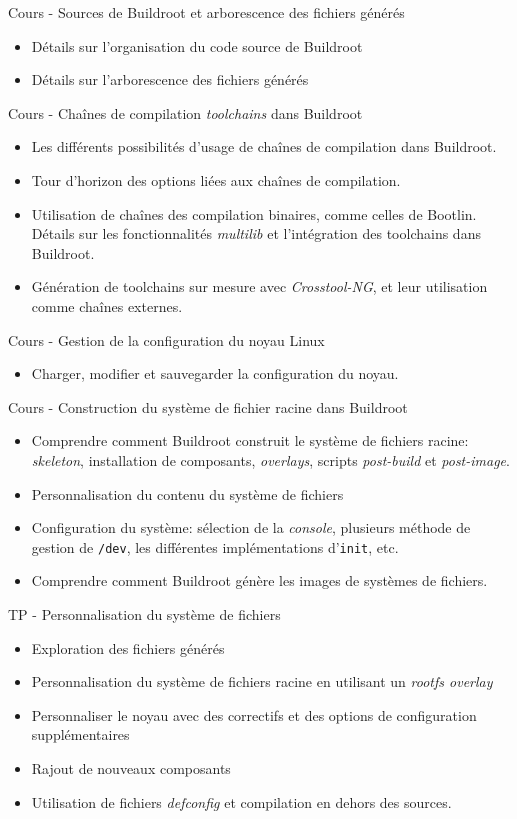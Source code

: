 \documentclass[a4paper,12pt,obeyspaces,spaces,hyphens]{article}
\begin{document}
\feagendatwocolumn
{Cours - Sources de Buildroot et arborescence des fichiers générés}
{
  \begin{itemize}
  \item Détails sur l'organisation du code source de Buildroot
  \item Détails sur l'arborescence des fichiers générés
  \end{itemize}
}
{Cours - Chaînes de compilation {\em toolchains} dans Buildroot}
{
  \begin{itemize}
  \item Les différents possibilités d'usage de chaînes de compilation
	dans Buildroot.
  \item Tour d'horizon des options liées aux chaînes de compilation.
  \item Utilisation de chaînes des compilation binaires, comme
	celles de Bootlin. Détails sur les fonctionnalités
        {\em multilib} et l'intégration des toolchains dans Buildroot.
  \item Génération de toolchains sur mesure avec {\em Crosstool-NG},
	et leur utilisation comme chaînes externes.
  \end{itemize}
}

\feagendatwocolumn
{Cours - Gestion de la configuration du noyau Linux}
{
  \begin{itemize}
  \item Charger, modifier et sauvegarder la configuration du noyau.
  \end{itemize}
}
{Cours - Construction du système de fichier racine dans Buildroot}
{
  \begin{itemize}
  \item Comprendre comment Buildroot construit le système de fichiers
	racine: {\em skeleton}, installation de composants, {\em
        overlays}, scripts {\em post-build} et {\em post-image}.
  \item Personnalisation du contenu du système de fichiers
  \item Configuration du système: sélection de la {\em console},
	plusieurs méthode de gestion de {\tt /dev}, les différentes
	implémentations d'{\tt init}, etc.
  \item Comprendre comment Buildroot génère les images de systèmes de
	fichiers.
  \end{itemize}
}

\feagendaonecolumn
{TP - Personnalisation du système de fichiers}
{
  \begin{itemize}
  \item Exploration des fichiers générés
  \item Personnalisation du système de fichiers racine en utilisant un {\em rootfs overlay}
  \item Personnaliser le noyau avec des correctifs et des options de
	configuration supplémentaires
  \item Rajout de nouveaux composants
  \item Utilisation de fichiers {\em defconfig} et compilation en
	dehors des sources.
  \end{itemize}
}
\end{document}
